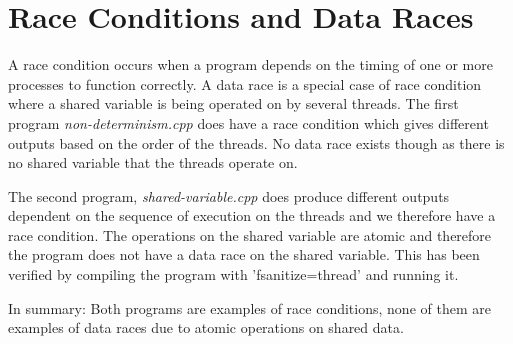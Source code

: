 \section{Race Conditions and Data Races}

A race condition occurs when a program depends on the timing of one or more
processes to function correctly. A data race is a special case of race condition
where a shared variable is being operated on by several threads. The first 
program \textit{non-determinism.cpp} does have a race condition which gives 
different outputs based on the order of the threads. No data race exists though 
as there is no shared variable that the threads operate on. 

The second program, \textit{shared-variable.cpp} does produce different outputs
dependent on the sequence of execution on the threads and we therefore
have a race condition. The operations on the shared variable are atomic and 
therefore the program does not have a data race on the shared variable.
This has been verified by compiling the program with 'fsanitize=thread' and 
running it.

In summary: Both programs are examples of race conditions, none of them are 
examples of data races due to atomic operations on shared data.
